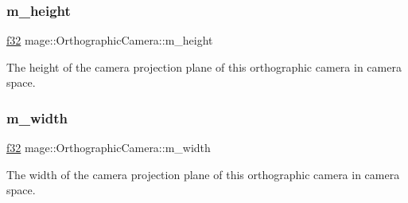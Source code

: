 \subsubsection{\texorpdfstring{m\+\_\+height}{m\_height}}
{\footnotesize\ttfamily \hyperlink{namespacemage_a6a44ad388483959dc4dff9f2aef91431}{f32} mage\+::\+Orthographic\+Camera\+::m\+\_\+height\hspace{0.3cm}{\ttfamily [private]}}

The height of the camera projection plane of this orthographic camera in camera space. \hypertarget{classmage_1_1_orthographic_camera_a8ef5fb497ae0ae764f3d3cd55b8cc81c}{}\label{classmage_1_1_orthographic_camera_a8ef5fb497ae0ae764f3d3cd55b8cc81c} 
\subsubsection{\texorpdfstring{m\+\_\+width}{m\_width}}
{\footnotesize\ttfamily \hyperlink{namespacemage_a6a44ad388483959dc4dff9f2aef91431}{f32} mage\+::\+Orthographic\+Camera\+::m\+\_\+width\hspace{0.3cm}{\ttfamily [private]}}

The width of the camera projection plane of this orthographic camera in camera space. 
